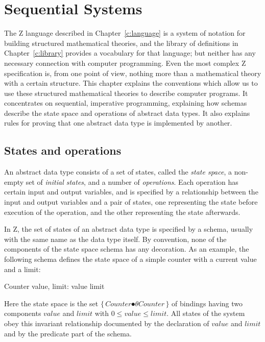 \chapter{Sequential Systems}\label{c:seqprog}

The Z language described in Chapter~\ref{c:language} is a system of
notation for building structured mathematical theories, and the
library of definitions in Chapter~\ref{c:library} provides a
vocabulary for that language; but neither has any necessary connection
with computer programming.  Even the most complex Z specification is,
from one point of view, nothing more than a mathematical theory with a
certain structure.  This chapter explains the conventions which allow
us to use these structured mathematical theories to describe computer
programs.  It concentrates on sequential, imperative programming,
explaining how schemas describe the state space and operations of
abstract data types.  It also explains rules for proving that one
abstract data type is implemented by another.

\section{States and operations}

An abstract data type%
consists of a set of states, called the
{\em state space\/},%
a non-empty set of {\em initial states}, and a number of {\em operations}.
Each operation has certain input and output variables, and is specified by a
relationship between the input and output variables and a pair of states, one
representing the state before execution of the operation, and the other
representing the state afterwards.

In Z, the set of states of an abstract data type is specified by a
schema, usually with the same name as the data type
itself.  By convention, none of the components of the state space
schema has any decoration. As an example, the following schema
defines the state space of a simple counter with a current value and a
limit:
\begin{schema}{Counter}
	value, limit: \nat
\where
	value \leq limit
\end{schema}
Here the state space is the set $\{\,Counter \spot \theta Counter\,\}$
of bindings having two components $value$ and $limit$ with $0 \leq
value \leq limit$. All states of the system obey this invariant
relationship documented by the declaration of $value$ and $limit$ and
by the predicate part of the schema.

